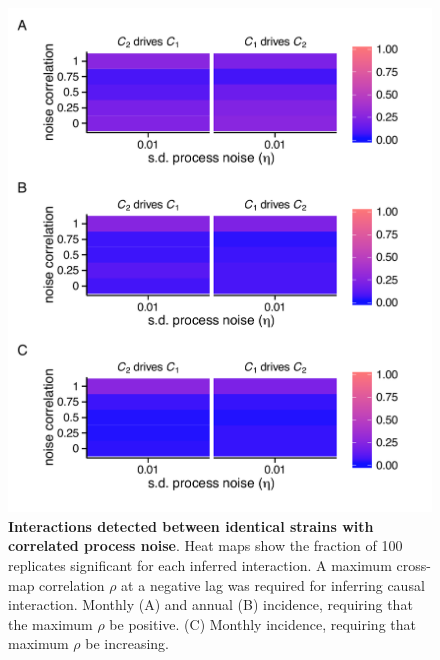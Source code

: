 \documentclass[10pt]{article}
\begin{document}
\begin{figure}
\begin{center}
  \includegraphics[width=5in]{dataflow/out/fig_detect_corrproc_identical/fig_detect_corrproc_identical.pdf}
  \end{center}
  \caption{\textbf{Interactions detected between identical strains with correlated process noise}. Heat maps show the fraction of 100 replicates significant for each inferred interaction. A maximum cross-map correlation $\rho$ at a negative lag was required for inferring causal interaction. Monthly (A) and annual (B) incidence, requiring that the maximum $\rho$ be positive. (C) Monthly incidence, requiring that maximum $\rho$ be increasing.  \label{fig:identical_corr_tmp}}
\end{figure}
\end{document}
